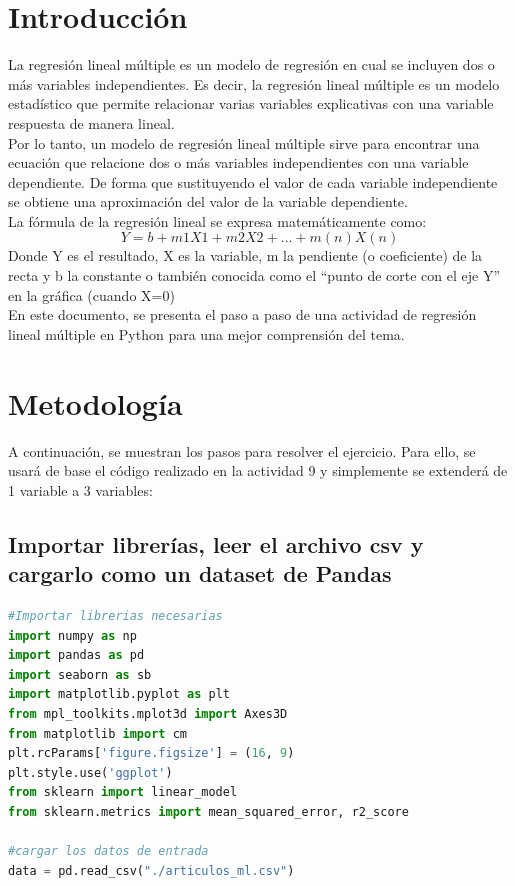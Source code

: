 \documentclass{article}
\begin{document}
\section{Introducción}
La regresión lineal múltiple es un modelo de regresión en cual se incluyen dos o más variables independientes. Es decir, la regresión lineal múltiple es un modelo estadístico que permite relacionar varias variables explicativas con una variable respuesta de manera lineal.\\
Por lo tanto, un modelo de regresión lineal múltiple sirve para encontrar una ecuación que relacione dos o más variables independientes con una variable dependiente. De forma que sustituyendo el valor de cada variable independiente se obtiene una aproximación del valor de la variable dependiente.\\

La fórmula de la regresión lineal se expresa matemáticamente como:
\begin{equation}
Y = b + m1X1 + m2X2 +…+ m(n)X(n)
\end{equation}
Donde Y es el resultado, X es la variable, m la pendiente (o coeficiente) de la recta y b la constante o también conocida como el “punto de corte con el eje Y” en la gráfica (cuando X=0)\\

En este documento, se presenta el paso a paso de una actividad de regresión lineal múltiple en Python para una mejor comprensión del tema.\\

\section{Metodología}
A continuación, se muestran los pasos para resolver el ejercicio. Para ello, se usará de base el código realizado en la actividad 9 y simplemente se extenderá de 1 variable a 3 variables:

\subsection{Importar librerías, leer el archivo csv y cargarlo como un dataset de Pandas} 
\begin{lstlisting}[language=Python]
#Importar librerias necesarias
import numpy as np  
import pandas as pd  
import seaborn as sb 
import matplotlib.pyplot as plt 
from mpl_toolkits.mplot3d import Axes3D 
from matplotlib import cm 
plt.rcParams['figure.figsize'] = (16, 9)
plt.style.use('ggplot')
from sklearn import linear_model 
from sklearn.metrics import mean_squared_error, r2_score

#cargar los datos de entrada
data = pd.read_csv("./articulos_ml.csv")
\end{lstlisting}
\end{document}
